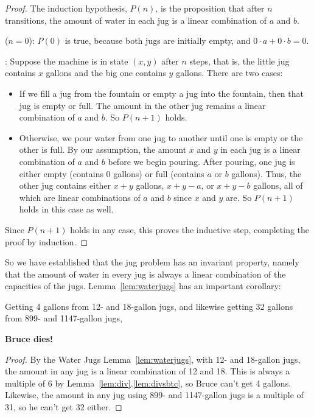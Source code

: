 \begin{proof}
The induction hypothesis, $P(n)$, is the proposition that after $n$ transitions, the amount
of water in each jug is a linear combination of $a$ and $b$.

 ($n = 0$): $P(0)$ is true, because both jugs are initially empty,
and $0 \cdot a + 0 \cdot b = 0$.

: Suppose the machine is in state $(x,y)$ after $n$ steps,
that is, the little jug contains $x$ gallons and the big one contains $y$ gallons.  There
are two cases:

\begin{itemize}

\item If we fill a jug from the fountain or empty a jug into the fountain, then that jug is
  empty or full.  The amount in the other jug remains a linear combination of $a$ and $b$.
  So $P(n+1)$ holds.

\item Otherwise, we pour water from one jug to another until one is empty or the other is
  full.  By our assumption, the amount $x$ and $y$ in each jug is a linear combination of
  $a$ and $b$ before we begin pouring.  After pouring, one jug is either empty (contains 0
  gallons) or full (contains $a$ or $b$ gallons).  Thus, the other jug contains either $x +
  y$ gallons, $x + y - a$, or $x + y - b$ gallons, all of which are linear combinations of
  $a$ and $b$ since $x$ and $y$ are.  So $P(n+1)$ holds in this case as well.
\end{itemize}
Since $P(n+1)$ holds in any case, this proves the inductive step, completing the proof by
induction.
\end{proof}

So we have established that the jug problem has an invariant property, namely that the
amount of water in every jug is always a linear combination of the capacities of the jugs.
Lemma~\ref{lem:waterjugs} has an important corollary:
\begin{corollary*}
Getting 4 gallons from 12- and 18-gallon jugs, and likewise getting 32 gallons from 899-
and 1147-gallon jugs,
\begin{center}
\textbf{Bruce dies!}
\end{center}
\end{corollary*}

\begin{proof}
By the Water Jugs Lemma~\ref{lem:waterjugs}, with 12- and 18-gallon jugs, the amount in any
jug is a linear combination of 12 and 18.  This is always a multiple of 6 by
Lemma~\ref{lem:div}.\ref{lem:divsbtc}, so Bruce can't get 4 gallons.  Likewise, the amount
in any jug using 899- and 1147-gallon jugs is a multiple of 31, so he can't get 32 either.
\end{proof}

